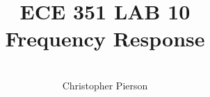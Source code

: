 



\documentclass[12pt]{article}

\usepackage[english]{babel}
\usepackage[utf8x]{inputenc}
\usepackage[T1]{fontenc}
\usepackage{graphicx}
\usepackage{amsmath}
\usepackage{caption}
\usepackage{float}
\usepackage{caption}
\usepackage{subcaption}
\usepackage{rotating}
\usepackage{setspace}

\usepackage[a4paper,top=3cm,bottom=2cm,left=3cm,right=3cm,marginparwidth=1.75cm]{geometry}

\usepackage[colorinlistoftodos]{todonotes}
\usepackage[colorlinks=true, allcolors=blue]{hyperref}
\usepackage{listings}
\usepackage{gensymb}
\usepackage{ mathrsfs }



\title{%
	\textbf{ ECE 351 LAB 10} \\
Frequency Response 
	 }

\author{\\
	Christopher Pierson}

	
	
\vspace{\fill}
\maketitle
\vspace{\fill}
\clearpage

